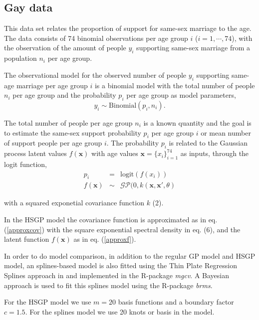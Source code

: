 \documentclass[]{interact}
\theoremstyle{plain}%
\theoremstyle{definition}
\theoremstyle{remark}
\begin{document}
\subsection{Gay data}\label{sec:gay_data}
This data set relates the proportion of support for same-sex marriage to the age. The data consists of 74 binomial observations per age group $i$ ($i=1,\cdots,74$), with the observation of the amount of people $y_i$ supporting same-sex marriage from a population $n_i$ per age group. 

The observational model for the observed number of people $y_i$ supporting same-age marriage per age group $i$ is a binomial model with the total number of people $n_i$ per age group and the probability $p_i$ per age group as model parameters,
%
\begin{equation*}
y_i \sim \text{Binomial}(p_i, n_i).
\end{equation*}

\noindent The total number of people per age group $n_i$ is a known quantity and the goal is to estimate the same-sex support probability $p_i$ per age group $i$ or mean number of support people per age group $i$. The probability $p_i$ is related to the Gaussian process latent values $f(\mathbf{x})$ with age values $\mathbf{x}=\{x_i\}_{i=1}^{74}$ as inputs, through the logit function,
%
\begin{eqnarray*} \label{eq:gpprior_gay}
p_i &=& \text{logit}(f(x_i)) \nonumber \\
f(\mathbf{x}) &\sim& \mathcal{GP}(0, k(\mathbf{x},\mathbf{x}', \theta)
\end{eqnarray*}

\noindent with a squared exponetial covariance function $k$ (2). 

In the HSGP model the covariance function is approximated as in eq. (\ref{approxcov}) with the square exponential spectral density in eq. (6), and the latent function $f(\mathbf{x})$ as in eq. (\ref{approxf}). 

In order to do model comparison, in addition to the regular GP model and HSGP model, an splines-based model is also fitted using the Thin Plate Regression Splines approach in \cite{wood2003thin} and implemented in the R-package \textit{mgcv}. A Bayesian approach is used to fit this splines model using the R-package \textit{brms}.

For the HSGP model we use $m=20$ basis functions and a boundary factor $c=1.5$. For the splines model we use 20 knots or basis in the model.
\end{document}
